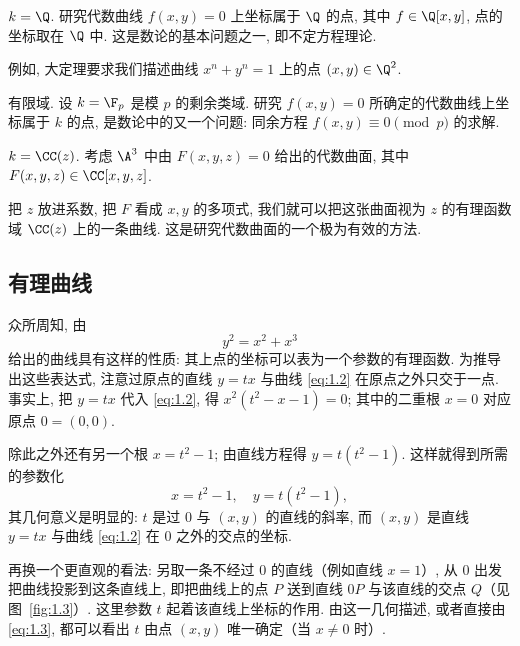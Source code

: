 \begin{compactenum}[(1)]
	\item $k = \Q$. 研究代数曲线 $f(x,y) = 0$ 上坐标属于 $\Q$ 的点, 其中 $f \in \Q[x,y]$, 点的坐标取在 $\Q$ 中. 这是数论的基本问题之一, 即不定方程理论.

	例如, \trFermat{}大定理要求我们描述曲线 $x^n + y^n = 1$ 上的点 $(x,y) \in \Q^2$.
	\item 有限域. 设 $k = \F_p$ 是模 $p$ 的剩余类域. 研究 $f(x,y) = 0$ 所确定的代数曲线上坐标属于 $k$ 的点, 是数论中的又一个问题: 同余方程 $f(x,y) \equiv 0 \pmod{p}$ 的求解.
	\item $k = \CC(z)$. 考虑 $\A^3$ 中由 $F(x,y,z) = 0$ 给出的代数曲面, 其中 $F(x,y,z) \in \CC[x,y,z]$.

	把 $z$ 放进系数, 把 $F$ 看成 $x, y$ 的多项式, 我们就可以把这张曲面视为 $z$ 的有理函数域 $\CC(z)$ 上的一条曲线. 这是研究代数曲面的一个极为有效的方法.
\end{compactenum}

\subsection{有理曲线}

众所周知, 由
\begin{equation}
	\label{eq:1.2}
	y^2 = x^2 + x^3
\end{equation}
给出的曲线具有这样的性质: 其上点的坐标可以表为一个参数的有理函数. 为推导出这些表达式, 注意过原点的直线 $y = tx$ 与曲线 \eqref{eq:1.2} 在原点之外只交于一点. 事实上, 把 $y = tx$ 代入 \eqref{eq:1.2}, 得 $x^2(t^2 - x - 1) = 0$; 其中的二重根 $x = 0$ 对应原点 $0 = (0,0)$.

除此之外还有另一个根 $x = t^2 - 1$; 由直线方程得 $y = t(t^2 - 1)$. 这样就得到所需的参数化
\begin{equation}
	\label{eq:1.3}
	x = t^2 - 1, \quad y = t(t^2 - 1),
\end{equation}
其几何意义是明显的: $t$ 是过 $0$ 与 $(x,y)$ 的直线的斜率, 而 $(x,y)$ 是直线 $y = tx$ 与曲线 \eqref{eq:1.2} 在 $0$ 之外的交点的坐标.

再换一个更直观的看法: 另取一条不经过 $0$ 的直线（例如直线 $x = 1$）, 从 $0$ 出发把曲线投影到这条直线上, 即把曲线上的点 $P$ 送到直线 $0P$ 与该直线的交点 $Q$（见图~\ref{fig:1.3}）. 这里参数 $t$ 起着该直线上坐标的作用. 由这一几何描述, 或者直接由 \eqref{eq:1.3}, 都可以看出 $t$ 由点 $(x,y)$ 唯一确定（当 $x \ne 0$ 时）.

